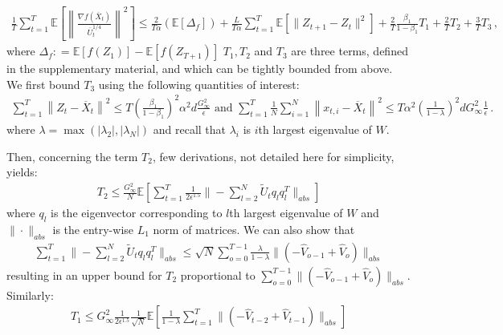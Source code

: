 \documentclass{article} %
\begin{document}
 {\small
 \begin{align} \label{eq: exp_telescope_sketch}
 \frac{1}{T}\sum_{t=1}^T  \mathbb E \left [\left\|\frac{\nabla f( \overline X_{t})}{\overline U_{t}^{1/4}}\right\|^2  \right] \leq \frac{2}{T\alpha} ( \mathbb E  [\Delta_f]) + \frac{L}{T\alpha} \sum_{t=1}^T\mathbb E\left[\| Z_{t+1}-  Z_{t}\|^2 \right]+ \frac{2}{T}\frac{\beta_1}{1-\beta_1} T_1 + \frac{2}{T} T_2 + \frac{3}{T} {T_3} \, ,
 \end{align}
 }%
where $\Delta_f : = \mathbb E [f( Z_{1})] - \mathbb E [f( Z_{T+1})]$ $T_1, T_2$ and $T_3$ are three terms, defined in the supplementary material, and which can be tightly bounded from above. 
We first bound $T_3$ using the following quantities of interest:
 {\small
 \begin{align}
 \sum_{t=1}^T\left\|  Z_{t} -  \overline X_{t}\right\|^2 \leq T \left( \frac{\beta_1}{1-\beta_1}\right)^2 \alpha^2 d \frac{G_{\infty}^2}{\epsilon} \text{\ \ and\ \ }
 \sum_{t=1}^T\frac{1}{N}\sum_{i=1}^N\left\| {  x_{t,i} -   \overline X_{t}}  \right\|^2 \leq T \alpha^2 \left (\frac{1}{1-\lambda} \right)^2 d G_{\infty}^2 \frac{1}{\epsilon} \,.
 \end{align}
 }%
 where $\lambda = \max (|\lambda_2|,|\lambda_N|)$ and recall that $\lambda_i$ is $i$th largest eigenvalue of $W$.
 
 
 Then, concerning the term $T_2$, few derivations, not detailed here for simplicity, yields:
 {\small
 \begin{align}
 T_2 \leq \frac{G_{\infty}^2}{N} \mathbb E \left[\sum_{t=1}^T \frac{1}{2\epsilon^{1.5}}  \| - \sum_{l=2}^N  \tilde U_t q_l q_l^T \|_{abs} \right] 
 \end{align}
 }%
 where $q_l$ is the eigenvector corresponding to $l$th largest eigenvalue of $W$ and $\|\cdot\|_{abs}$ is the entry-wise $L_1$ norm of  matrices.
 We can also show that 
 {\small
 \begin{align}
 \sum_{t=1}^T  \| - \sum_{l=2}^N  \tilde U_t q_l q_l^T \|_{abs}  \leq {\sqrt{N}} \sum_{o=0}^{T-1} \frac{\lambda}{1-\lambda}     \|    (- \hat V_{o-1} + \hat V_{o} ) \|_{abs} 
 \end{align}
 }%
 resulting in an upper bound for $T_2$ proportional to $\sum_{o=0}^{T-1}  \|    (- \hat V_{o-1} + \hat V_{o} ) \|_{abs} $. 
 Similarly:
 {\small
 \begin{align}
 T_1 \leq G_{\infty}^2 \frac{1}{2\epsilon^{1.5}} \frac{1}{\sqrt{N}}   \mathbb E \left [  \frac{1}{1-\lambda}   \sum_{t=1}^T  \| ( - \hat V_{t-2} + \hat V_{t-1}) \|_{abs}   \right]
 \end{align}
 }%
\end{document}
